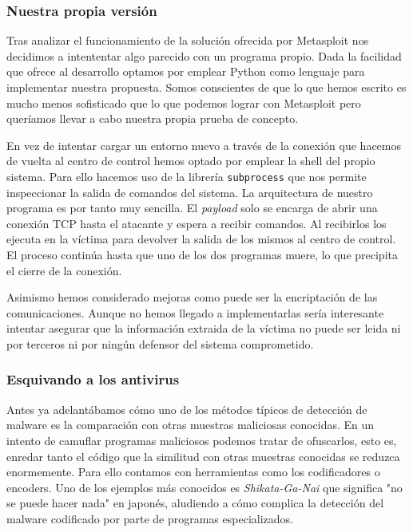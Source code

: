\documentclass[12pt]{article}
\newcommand{\newpar} {
    \vskip 1cm
}
\begin{document}
            \subsubsection{Nuestra propia versión}
                Tras analizar el funcionamiento de la solución ofrecida por Metasploit nos decidimos a intententar algo parecido con un programa propio. Dada la facilidad que ofrece al desarrollo optamos por emplear Python como lenguaje para implementar nuestra propuesta. Somos conscientes de que lo que hemos escrito es mucho menos sofisticado que lo que podemos lograr con Metasploit pero queríamos llevar a cabo nuestra propia prueba de concepto.

                \newpar

                En vez de intentar cargar un entorno nuevo a través de la conexión que hacemos de vuelta al centro de control hemos optado por emplear la shell del propio sistema. Para ello hacemos uso de la librería \texttt{subprocess} que nos permite inspeccionar la salida de comandos del sistema. La arquitectura de nuestro programa es por tanto muy sencilla. El \textit{payload} solo se encarga de abrir una conexión TCP hasta el atacante y espera a recibir comandos. Al recibirlos los ejecuta en la víctima para devolver la salida de los mismos al centro de control. El proceso continúa hasta que uno de los dos programas muere, lo que precipita el cierre de la conexión.

                \newpar

                Asimismo hemos considerado mejoras como puede ser la encriptación de las comunicaciones. Aunque no hemos llegado a implementarlas sería interesante intentar asegurar que la información extraida de la víctima no puede ser leida ni por terceros ni por ningún defensor del sistema comprometido.

            \subsubsection{Esquivando a los antivirus}
                Antes ya adelantábamos cómo uno de los métodos típicos de detección de malware es la comparación con otras muestras maliciosas conocidas. En un intento de camuflar programas maliciosos podemos tratar de ofuscarlos, esto es, enredar tanto el código que la similitud con otras muestras conocidas se reduzca enormemente. Para ello contamos con herramientas como los codificadores o encoders. Uno de los ejemplos más conocidos es \textit{Shikata-Ga-Nai} que significa "no se puede hacer nada" en japonés, aludiendo a cómo complica la detección del malware codificado por parte de programas especializados.
\end{document}
